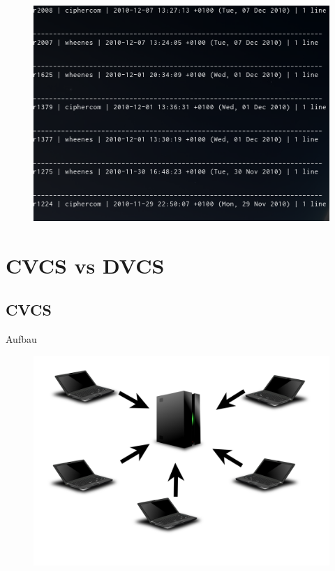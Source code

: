 \documentclass[presentation]{beamer}
\begin{document}
\begin{frame}
  \begin{figure}
    \centering
    \includegraphics[width=\textwidth]{img/log}
  \end{figure}
\end{frame}
\section{CVCS vs DVCS}
\subsection{CVCS}
\begin{frame}{Aufbau}
  \begin{figure}
    \centering
    \includegraphics[width=\textwidth]{img/cvcs}
  \end{figure}
\end{frame}
\end{document}
